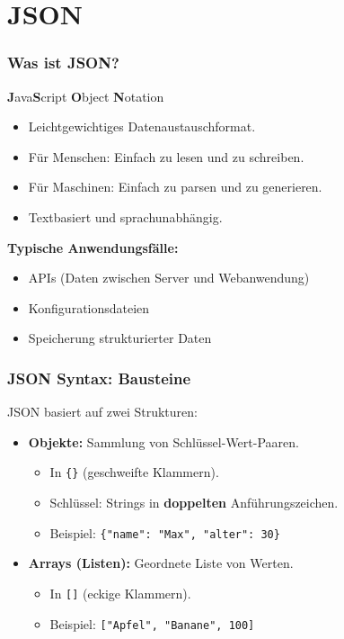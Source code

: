 \documentclass[aspectratio=169]{beamer} %
\begin{document}
\section{JSON}

\begin{frame}[fragile]
\frametitle{Was ist JSON?}
\textbf{J}ava\textbf{S}cript \textbf{O}bject \textbf{N}otation
\begin{itemize}
    \item Leichtgewichtiges Datenaustauschformat.
    \item Für Menschen: Einfach zu lesen und zu schreiben.
    \item Für Maschinen: Einfach zu parsen und zu generieren.
    \item Textbasiert und sprachunabhängig.
\end{itemize}
\textbf{Typische Anwendungsfälle:}
\begin{itemize}
    \item APIs (Daten zwischen Server und Webanwendung)
    \item Konfigurationsdateien
    \item Speicherung strukturierter Daten
\end{itemize}
\end{frame}

\begin{frame}[fragile]
\frametitle{JSON Syntax: Bausteine}
JSON basiert auf zwei Strukturen:
\begin{itemize}
    \item \textbf{Objekte:} Sammlung von Schlüssel-Wert-Paaren.
    \begin{itemize}
        \item In \texttt{\{\}} (geschweifte Klammern).
        \item Schlüssel: Strings in \textbf{doppelten} Anführungszeichen.
        \item Beispiel: \texttt{\{"name": "Max", "alter": 30\}}
    \end{itemize}
    \item \textbf{Arrays (Listen):} Geordnete Liste von Werten.
    \begin{itemize}
        \item In \texttt{[]} (eckige Klammern).
        \item Beispiel: \texttt{["Apfel", "Banane", 100]}
    \end{itemize}
\end{itemize}
\end{frame}
\end{document}
